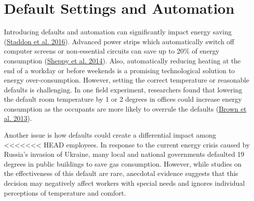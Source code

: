 \documentclass[
  12pt,
  captions=heading]{scrreport}
\begin{document}
\hypertarget{default-settings-and-automation}{%
\section{Default Settings and
Automation}\label{default-settings-and-automation}}

Introducing defaults and automation can significantly impact energy
saving (\protect\hyperlink{ref-staddon2016intervening}{Staddon et al.
2016}). Advanced power strips which automatically switch off computer
screens or non-essential circuits can save up to 20\% of energy
consumption (\protect\hyperlink{ref-sheppy2014reducing}{Sheppy et al.
2014}). Also, automatically reducing heating at the end of a workday or
before weekends is a promising technological solution to energy
over-consumption. However, setting the correct temperature or reasonable
defaults is challenging. In one field experiment, researchers found that
lowering the default room temperature by 1 or 2 degrees in offices could
increase energy consumption as the occupants are more likely to overrule
the defaults (\protect\hyperlink{ref-brown2013testing}{Brown et al.
2013}).

Another issue is how defaults could create a differential impact among
<<<<<<< HEAD
employees. In response to the current energy crisis caused by Russia's
invasion of Ukraine, many local and national governments defaulted 19
degrees in public buildings to save gas consumption. However, while
studies on the effectiveness of this default are rare, anecdotal
evidence suggests that this decision may negatively affect workers with
special needs and ignores individual perceptions of temperature and
comfort.
\end{document}
